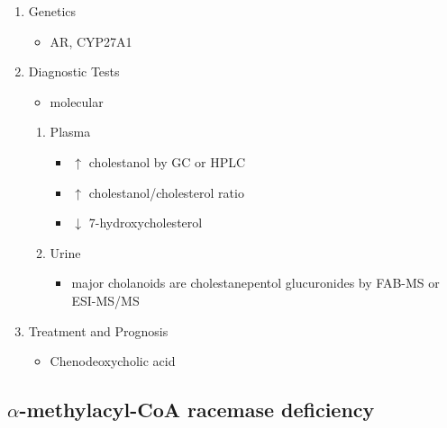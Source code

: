 \documentclass{scrartcl}
\begin{document}
\begin{enumerate}
\item Genetics
\label{sec:orge99900a}
\begin{itemize}
\item AR, CYP27A1
\end{itemize}

\item Diagnostic Tests
\label{sec:org2805b9c}
\begin{itemize}
\item molecular
\end{itemize}
\begin{enumerate}
\item Plasma
\label{sec:org109419e}
\begin{itemize}
\item \(\uparrow\) cholestanol by GC or HPLC
\item \(\uparrow\) cholestanol/cholesterol ratio
\item \(\downarrow\) 7-hydroxycholesterol
\end{itemize}
\item Urine
\label{sec:org504b262}
\begin{itemize}
\item major cholanoids are cholestanepentol glucuronides by FAB-MS or ESI-MS/MS
\end{itemize}
\end{enumerate}

\item Treatment and Prognosis
\label{sec:orgab35674}
\begin{itemize}
\item Chenodeoxycholic acid
\end{itemize}
\end{enumerate}
\subsection{\(\alpha\)-methylacyl-CoA racemase deficiency}
\label{sec:org28472da}
\end{document}

